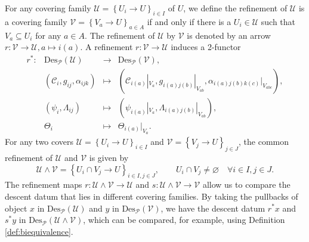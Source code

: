 \documentclass[reqno]{amsart}
\theoremstyle{definition}
\theoremstyle{remark}
\begin{document}
For any covering family $\mathcal{U}=\left\{U_i \longrightarrow U\right\}_{i\in I}$ of $U$, we define the refinement of $\mathcal{U}$ is a covering family $\mathcal{V}=\left\{V_a \longrightarrow U\right\}_{a\in A}$ if and only if there is a $U_i \in \mathcal{U}$ such that $V_a \subseteq  U_i$ for any $a \in A$. The refinement of $\mathcal{U}$ by $\mathcal{V}$ is denoted by an arrow $r:\mathcal{V} \longrightarrow \mathcal{U},a\longmapsto i(a)$. A refinement $r:\mathcal{V} \longrightarrow \mathcal{U}$ induces a 2-functor 
\begin{equation}
   \begin{array}{rccc}
r^*: & \text{Des}_\mathscr{P}(\mathcal{U})& \longrightarrow  & \text{Des}_\mathscr{P}(\mathcal{V}), \\
 &\left(\mathcal{C}_i,g_{ij},\alpha_{ijk}\right) & \longmapsto  & \left({\mathcal{C}_{i(a)}}|_{V_a},g_{i(a)j(b)}|_{V_{ab}},\alpha_{i(a)j(b)k(c)}|_{V_{abc}}\right),
 \\
 & \left(\psi_i,\Lambda_{ij}\right) &\longmapsto & \left(\psi_{i(a)}|_{V_a},\Lambda_{i(a)j(b)}|_{V_{ab}}\right), \\
 & \Theta_i &\longmapsto & \Theta_{i(a)}|_{V_a}.
\end{array}
\end{equation}
For any two covers $\mathcal{U}=\left\{U_i \longrightarrow U\right\}_{i\in I}$ and $\mathcal{V}=\left\{V_j \longrightarrow U\right\}_{j\in J}$, the common refinement of $\mathcal{U}$ and $\mathcal{V}$ is given by
\begin{equation}
    \mathcal{U} \wedge \mathcal{V} = \left\{U_i \cap V_j \longrightarrow U\right\}_{i\in I,j\in J},\qquad U_i \cap V_j\neq \varnothing \quad \forall i\in I,j\in J.
\end{equation}
The refinement maps $r: \mathcal{U} \wedge \mathcal{V}\longrightarrow \mathcal{U}$ and $s: \mathcal{U} \wedge \mathcal{V} \longrightarrow \mathcal{V}$ allow us to compare the descent datum that lies in different covering families. By taking the pullbacks of object $x$ in $\text{Des}_\mathscr{P}(\mathcal{U})$ and $y$ in $\text{Des}_\mathscr{P}(\mathcal{V})$, we have the descent datum $r^*x$ and $s^* y$ in $\text{Des}_\mathscr{P}( \mathcal{U} \wedge \mathcal{V} )$, which can be compared, for example, using Definition \ref{def:biequivalence}.
\end{document}
